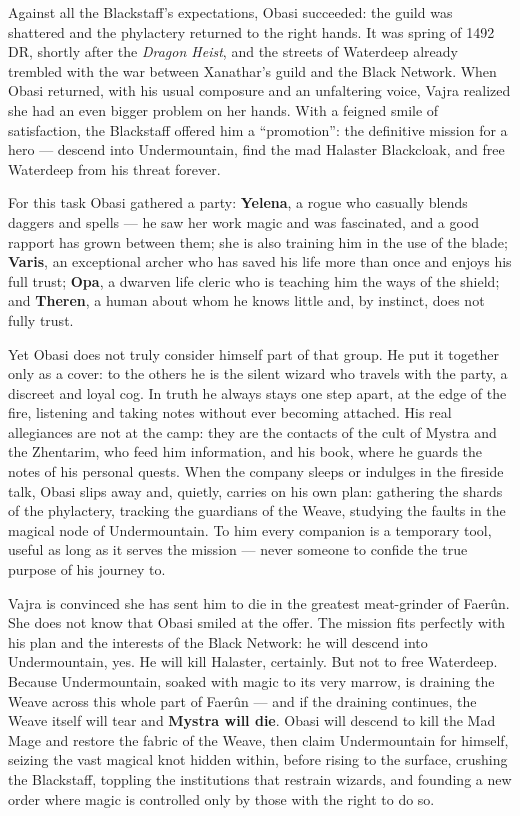 \documentclass[letterpaper,twocolumn,openany,nodeprecatedcode,justified]{dndbook}
\begin{document}
Against all the Blackstaff's expectations, Obasi succeeded: the guild
was shattered and the phylactery returned to the right hands. It was
spring of 1492 DR, shortly after the \emph{Dragon Heist}, and the streets
of Waterdeep already trembled with the war between Xanathar's guild and
the Black Network. When Obasi returned, with his usual composure and an
unfaltering voice, Vajra realized she had an even bigger problem on her
hands. With a feigned smile of satisfaction, the Blackstaff offered him a
``promotion'': the definitive mission for a hero --- descend into
Undermountain, find the mad Halaster Blackcloak, and free Waterdeep from
his threat forever.

For this task Obasi gathered a party: \textbf{Yelena}, a rogue who
casually blends daggers and spells --- he saw her work magic and was
fascinated, and a good rapport has grown between them; she is also
training him in the use of the blade; \textbf{Varis}, an exceptional
archer who has saved his life more than once and enjoys his full trust;
\textbf{Opa}, a dwarven life cleric who is teaching him the ways of the
shield; and \textbf{Theren}, a human about whom he knows little and, by
instinct, does not fully trust.

Yet Obasi does not truly consider himself part of that group. He put it
together only as a cover: to the others he is the silent wizard who
travels with the party, a discreet and loyal cog. In truth he always
stays one step apart, at the edge of the fire, listening and taking notes
without ever becoming attached. His real allegiances are not at the camp:
they are the contacts of the cult of Mystra and the Zhentarim, who feed
him information, and his book, where he guards the notes of his personal
quests. When the company sleeps or indulges in the fireside talk, Obasi
slips away and, quietly, carries on his own plan: gathering the shards of
the phylactery, tracking the guardians of the Weave, studying the faults
in the magical node of Undermountain. To him every companion is a
temporary tool, useful as long as it serves the mission --- never someone
to confide the true purpose of his journey to.

Vajra is convinced she has sent him to die in the greatest meat-grinder
of Faerûn. She does not know that Obasi smiled at the offer. The mission
fits perfectly with his plan and the interests of the Black Network: he
will descend into Undermountain, yes. He will kill Halaster, certainly.
But not to free Waterdeep. Because Undermountain, soaked with magic to
its very marrow, is draining the Weave across this whole part of Faerûn
--- and if the draining continues, the Weave itself will tear and
\textbf{Mystra will die}. Obasi will descend to kill the Mad Mage and
restore the fabric of the Weave, then claim Undermountain for himself,
seizing the vast magical knot hidden within, before rising to the surface,
crushing the Blackstaff, toppling the institutions that restrain wizards,
and founding a new order where magic is controlled only by those with the
right to do so.
\end{document}
